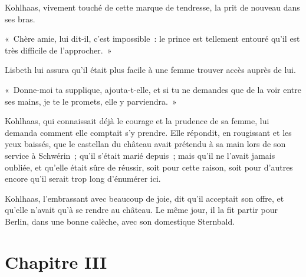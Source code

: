 \documentclass[french,twoside]{book} %
\newcommand\chapteropen{} %
\newcommand\chapterclose{} %
\begin{document}
Kohlhaas, vivement touché de cette marque de tendresse, la prit de nouveau dans ses bras.\par
« Chère amie, lui dit-il, c’est impossible : le prince est tellement entouré qu’il est très difficile de l’approcher. »\par
Lisbeth lui assura qu’il était plus facile à une femme trouver accès auprès de lui.\par
« Donne-moi ta supplique, ajouta-t-elle, et si tu ne demandes que de la voir entre ses mains, je te le promets, elle y parviendra. »\par
Kohlhaas, qui connaissait déjà le courage et la prudence de sa femme, lui demanda comment elle comptait s’y prendre. Elle répondit, en rougissant et les yeux baissés, que le castellan du château avait prétendu à sa main lors de son service à Schwérin ; qu’il s’était marié depuis ; mais qu’il ne l’avait jamais oubliée, et qu’elle était sûre de réussir, soit pour cette raison, soit pour d’autres encore qu’il serait trop long d’énumérer ici.\par
Kohlhaas, l’embrassant avec beaucoup de joie, dit qu’il acceptait son offre, et qu’elle n’avait qu’à se rendre au château. Le même jour, il la fit partir pour Berlin, dans une bonne calèche, avec son domestique Sternbald.
\chapterclose


\chapteropen
\chapter[Chapitre III]{Chapitre III}\renewcommand{\leftmark}{Chapitre III}
\end{document}
